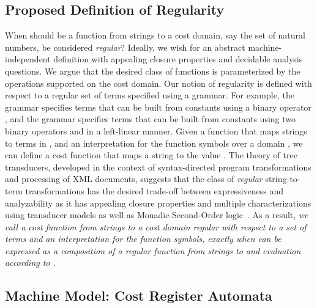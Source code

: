 \documentclass[11pt]{article}
\newcommand{\mypar}[1]{\subsection{#1}}
\begin{document}
\mypar{Proposed Definition of Regularity}

When should be a function from strings to a cost domain, say the set
 of natural numbers, be considered {\em regular\/}? Ideally, we
wish for an abstract machine-independent definition with appealing
closure properties and decidable analysis questions.  We argue that
the desired class of functions is parameterized by the operations
supported on the cost domain.  Our notion of regularity is defined
with respect to a regular set  of terms specified using a grammar.
For example, the grammar  specifies terms that can
be built from constants using a binary operator , and the grammar
 specifies terms that can be built from
constants using two binary operators  and  in a left-linear
manner.  Given a function  that maps strings to terms in , and
an interpretation  for the function symbols over a domain
, we can define a cost function  that maps a string  to
the value .  The theory of tree transducers, developed
in the context of syntax-directed program transformations and
processing of XML documents,  suggests that the class of {\em
regular\/} string-to-term transformations has the desired trade-off
between expressiveness and analyzability as it has appealing closure
properties and multiple characterizations using transducer models as
well as Monadic-Second-Order
logic~\cite{engelfriet_macro2_1999,courcelle_graph_2002,alur_stt_2011,Ho11}.
As a result, {\em we call a cost function  from strings to a cost
domain  regular with respect to a set  of terms and an
interpretation  for the function symbols, exactly when 
can be expressed as a composition of a regular function from strings
to  and evaluation according to .}

\mypar{Machine Model: Cost Register Automata}
\end{document}
